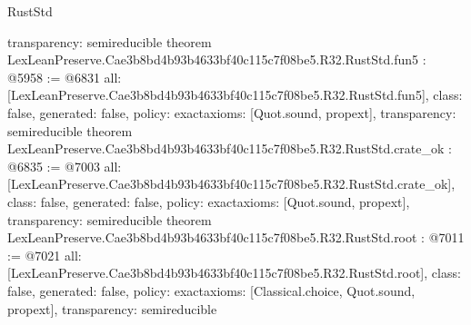 \begin{lexlean}{RustStd}
\begin{coremodule}
{  transparency: semireducible
}
theorem LexLeanPreserve.Cae3b8bd4b93b4633bf40c115c7f08be5.R32.RustStd.fun5 : @5958 := @6831 {
  all: [LexLeanPreserve.Cae3b8bd4b93b4633bf40c115c7f08be5.R32.RustStd.fun5],
  class: false,
  generated: false,
  policy: exact{axioms: [Quot.sound, propext]},
  transparency: semireducible
}
theorem LexLeanPreserve.Cae3b8bd4b93b4633bf40c115c7f08be5.R32.RustStd.crate_ok : @6835 := @7003 {
  all: [LexLeanPreserve.Cae3b8bd4b93b4633bf40c115c7f08be5.R32.RustStd.crate_ok],
  class: false,
  generated: false,
  policy: exact{axioms: [Quot.sound, propext]},
  transparency: semireducible
}
theorem LexLeanPreserve.Cae3b8bd4b93b4633bf40c115c7f08be5.R32.RustStd.root : @7011 := @7021 {
  all: [LexLeanPreserve.Cae3b8bd4b93b4633bf40c115c7f08be5.R32.RustStd.root],
  class: false,
  generated: false,
  policy: exact{axioms: [Classical.choice, Quot.sound, propext]},
  transparency: semireducible
}


\end{coremodule}
\end{lexlean}
